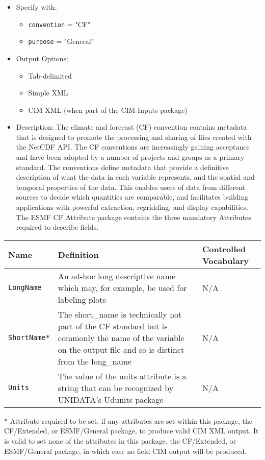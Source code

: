 \begin{itemize}
    \item Specify with:
    \begin{itemize}
        \item {\tt convention} = "CF"
        \item {\tt purpose} = "General"
    \end{itemize}
    \item Output Options:
    \begin{itemize}
        \item Tab-delimited
        \item Simple XML
        \item CIM XML (when part of the CIM Inputs package)
    \end{itemize} 
    \item  Description: The climate and forecast (CF) convention contains metadata that is designed to promote the processing and sharing of files created with the NetCDF API. The CF conventions are increasingly gaining acceptance and have been adopted by a number of projects and groups as a primary standard. The conventions define metadata that provide a definitive description of what the data in each variable represents, and the spatial and temporal properties of the data. This enables users of data from different sources to decide which quantities are comparable, and facilitates building applications with powerful extraction, regridding, and display capabilities. The ESMF CF Attribute package contains the three mandatory Attributes required to describe fields. 
\end{itemize}

\begin{tabular}{|p{5cm}|p{5cm}|p{35mm}|}
    \hline\hline
    {\bf Name } & {\bf Definition} & {\bf Controlled Vocabulary} \\
    \hline\hline
    {\tt LongName} & An ad-hoc long descriptive name which may, for example, be used for labeling plots & N/A\\
    {\tt ShortName*}  & The short\_name is technically not part of the CF standard but is commonly the name of the variable on the output file and so is
 distinct from the long\_name & N/A \\
    {\tt Units}  & The value of the units attribute is a string that can be recognized by UNIDATA's Udunits package & N/A\\
    \hline\hline
\end{tabular}
\linebreak
* Attribute required to be set, if any attributes are set within this package, the CF/Extended, or ESMF/General package, to produce valid CIM XML output. It is valid to set none of the attributes in this package, the CF/Extended, or ESMF/General package, in which case no field CIM output will be produced. \\

